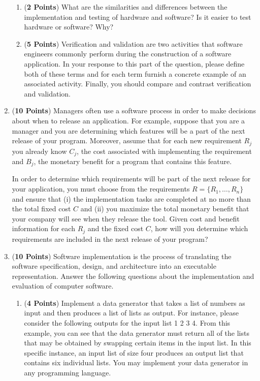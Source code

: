 \documentclass[12pt,epsf,psfig,graphics]{article}
\begin{document}
\begin{enumerate}
\begin{enumerate}
\item ({\bf 2 Points}) What are the similarities and differences
  between the implementation and testing of hardware and software?  Is
  it easier to test hardware or software?  Why?

\item ({\bf 5 Points}) Verification and validation are two activities
  that software engineers commonly perform during the construction of
  a software application.  In your response to this part of the
  question, please define both of these terms and for each term
  furnish a concrete example of an associated activity.  Finally, you
  should compare and contrast verification and validation.
  
\end{enumerate}

\newpage

\item ({\bf 10 Points}) Managers often use a software process in order
  to make decisions about when to release an application.  For
  example, suppose that you are a manager and you are determining
  which features will be a part of the next release of your program.
  Moreover, assume that for each new requirement $R_j$ you already
  know $C_j$, the cost associated with implementing the requirement
  and $B_j$, the monetary benefit for a program that contains this
  feature.

  In order to determine which requirements will be part of the next
  release for your application, you must choose from the requirements
  $R = \{ R_1, \ldots, R_n \}$ and ensure that (i) the implementation
  tasks are completed at no more than the total fixed cost $C$ and
  (ii) you maximize the total monetary benefit that your company will
  see when they release the tool.  Given cost and benefit information
  for each $R_j$ and the fixed cost $C$, how will you determine which
  requirements are included in the next release of your program?
    
\newpage

\item ({\bf 10 Points}) Software implementation is the process of
  translating the software specification, design, and architecture
  into an executable representation.  Answer the following questions
  about the implementation and evaluation of computer software.

\begin{enumerate}

  \item ({\bf 4 Points}) Implement a data generator that takes a list
    of numbers as input and then produces a list of lists as output.
    For instance, please consider the following outputs for the input
    list 1 2 3 4.  From this example, you can see that the data
    generator must return all of the lists that may be obtained by
    swapping certain items in the input list.  In this specific
    instance, an input list of size four produces an output list that
    contains six individual lists.  You may implement your data
    generator in any programming language.


\end{enumerate}
\end{enumerate}
\end{document}
